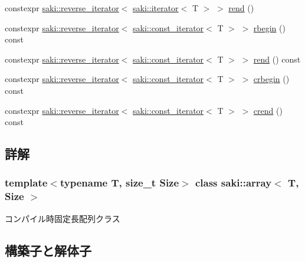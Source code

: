 \begin{DoxyCompactItemize}
\item 
constexpr \mbox{\hyperlink{classsaki_1_1reverse__iterator}{saki\+::reverse\+\_\+iterator}}$<$ \mbox{\hyperlink{classsaki_1_1iterator}{saki\+::iterator}}$<$ T $>$ $>$ \mbox{\hyperlink{classsaki_1_1array_a5d90bcfe2a449d94d9aa7e7b6e77858f}{rend}} ()
\item 
constexpr \mbox{\hyperlink{classsaki_1_1reverse__iterator}{saki\+::reverse\+\_\+iterator}}$<$ \mbox{\hyperlink{classsaki_1_1const__iterator}{saki\+::const\+\_\+iterator}}$<$ T $>$ $>$ \mbox{\hyperlink{classsaki_1_1array_addf57b18179a7556cf6fb177871873df}{rbegin}} () const
\item 
constexpr \mbox{\hyperlink{classsaki_1_1reverse__iterator}{saki\+::reverse\+\_\+iterator}}$<$ \mbox{\hyperlink{classsaki_1_1const__iterator}{saki\+::const\+\_\+iterator}}$<$ T $>$ $>$ \mbox{\hyperlink{classsaki_1_1array_a6816a951bfc1e6b13aec4fd54ec0bf63}{rend}} () const
\item 
constexpr \mbox{\hyperlink{classsaki_1_1reverse__iterator}{saki\+::reverse\+\_\+iterator}}$<$ \mbox{\hyperlink{classsaki_1_1const__iterator}{saki\+::const\+\_\+iterator}}$<$ T $>$ $>$ \mbox{\hyperlink{classsaki_1_1array_a16bc4c34eaa4c1f1e526636f0e37da27}{crbegin}} () const
\item 
constexpr \mbox{\hyperlink{classsaki_1_1reverse__iterator}{saki\+::reverse\+\_\+iterator}}$<$ \mbox{\hyperlink{classsaki_1_1const__iterator}{saki\+::const\+\_\+iterator}}$<$ T $>$ $>$ \mbox{\hyperlink{classsaki_1_1array_ad56a6f2dbbf83c04c97108b11402d50d}{crend}} () const
\end{DoxyCompactItemize}


\subsection{詳解}
\subsubsection*{template$<$typename T, size\+\_\+t Size$>$\newline
class saki\+::array$<$ T, Size $>$}

コンパイル時固定長配列クラス 

\subsection{構築子と解体子}
\mbox{\label{classsaki_1_1array_a7da734ab08c73225f9358fa6e0294025}} 

